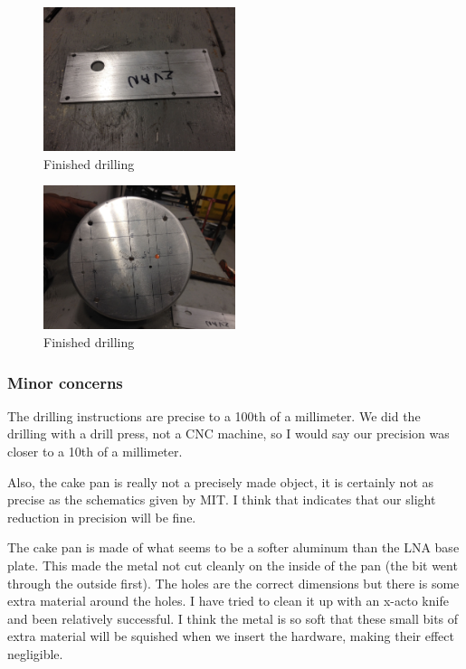 \documentclass[11pt]{article} %
\begin{document}
\begin{figure}
  \centering
  \caption{ Finished drilling }
  \includegraphics[width=0.50\textwidth]{feed/06.jpeg}
\end{figure}


\begin{figure}
  \centering
  \caption{ Finished drilling }
  \includegraphics[width=0.50\textwidth]{feed/07.jpeg}
\end{figure}



\subsubsection{Minor concerns}
The drilling instructions are precise to a 100th of a millimeter. We did the drilling with a drill press, not a CNC machine, so I would say our precision was closer to a 10th of a millimeter.

Also, the cake pan is really not a precisely made object, it is certainly not as precise as the schematics given by MIT. I think that indicates that our slight reduction in precision will be fine.

The cake pan is made of what seems to be a softer aluminum than the LNA base plate. This made the metal not cut cleanly on the inside of the pan (the bit went through the outside first). The holes are the correct dimensions but there is some extra material around the holes. I have tried to clean it up with an x-acto knife and been relatively successful. I think the metal is so soft that these small bits of extra material will be squished when we insert the hardware, making their effect negligible. 
\end{document}

